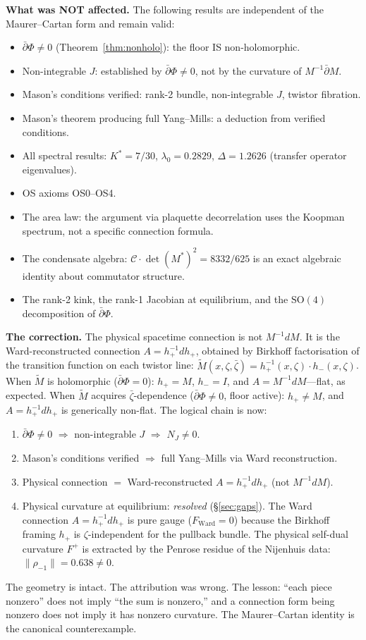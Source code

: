\documentclass[11pt,a4paper]{article}
\theoremstyle{definition}
\theoremstyle{remark}
\newcommand{\dbar}{\bar{\partial}}
\begin{document}
\textbf{What was NOT affected.} The following results are independent of the Maurer--Cartan form and remain valid:
\begin{itemize}[nosep]
\item $\dbar\Phi\neq 0$ (Theorem~\ref{thm:nonholo}): the floor IS non-holomorphic.
\item Non-integrable $J$: established by $\dbar\Phi\neq 0$, not by the curvature of $M^{-1}\dbar M$.
\item Mason's conditions verified: rank-2 bundle, non-integrable $J$, twistor fibration.
\item Mason's theorem producing full Yang--Mills: a deduction from verified conditions.
\item All spectral results: $K^*=7/30$, $\lambda_0=0.2829$, $\Delta=1.2626$ (transfer operator eigenvalues).
\item OS axioms OS0--OS4.
\item The area law: the argument via plaquette decorrelation uses the Koopman spectrum, not a specific connection formula.
\item The condensate algebra: $\mathcal{C}\cdot\det(M^*)^2=8332/625$ is an exact algebraic identity about commutator structure.
\item The rank-2 kink, the rank-1 Jacobian at equilibrium, and the $\mathrm{SO}(4)$ decomposition of $\dbar\Phi$.
\end{itemize}

\textbf{The correction.} The physical spacetime connection is not $M^{-1}dM$. It is the Ward-reconstructed connection $A=h_+^{-1}dh_+$, obtained by Birkhoff factorisation of the transition function on each twistor line: $\tilde{M}(x,\zeta,\bar\zeta)=h_+^{-1}(x,\zeta)\cdot h_-(x,\zeta)$. When $\tilde{M}$ is holomorphic ($\dbar\Phi=0$): $h_+=M$, $h_-=I$, and $A=M^{-1}dM$---flat, as expected. When $\tilde{M}$ acquires $\bar\zeta$-dependence ($\dbar\Phi\neq 0$, floor active): $h_+\neq M$, and $A=h_+^{-1}dh_+$ is generically non-flat. The logical chain is now:
\begin{enumerate}[nosep]
\item $\dbar\Phi\neq 0$ $\Rightarrow$ non-integrable $J$ $\Rightarrow$ $N_J\neq 0$. \checkmark
\item Mason's conditions verified $\Rightarrow$ full Yang--Mills via Ward reconstruction. \checkmark
\item Physical connection $=$ Ward-reconstructed $A=h_+^{-1}dh_+$ (not $M^{-1}dM$). \checkmark
\item Physical curvature at equilibrium: \emph{resolved} (\S\ref{sec:gaps}). The Ward connection $A=h_+^{-1}dh_+$ is pure gauge ($F_{\mathrm{Ward}}=0$) because the Birkhoff framing $h_+$ is $\zeta$-independent for the pullback bundle. The physical self-dual curvature $F^+$ is extracted by the Penrose residue of the Nijenhuis data: $\|\rho_{-1}\|=0.638\neq 0$.
\end{enumerate}
The geometry is intact. The attribution was wrong. The lesson: ``each piece nonzero'' does not imply ``the sum is nonzero,'' and a connection form being nonzero does not imply it has nonzero curvature. The Maurer--Cartan identity is the canonical counterexample.
\end{document}
